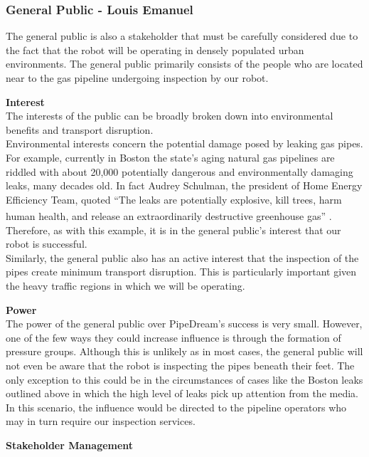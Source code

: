 \documentclass[11pt]{article}		%
\newcommand{\supercite}[1]{\textsuperscript{\cite{#1}}}		%
\begin{document}
		\subsubsection[General Public]{General Public - Louis Emanuel}
			The general public is also a stakeholder that must be carefully considered due to the fact that the robot will be operating in densely populated urban environments. The general public primarily consists of the people who are located near to the gas pipeline undergoing inspection by our robot.
			
			\textbf{Interest}\\
	        The interests of the public can be broadly broken down into environmental benefits and transport disruption.\\
		    \hspace*{3ex}Environmental interests concern the potential damage posed by leaking gas pipes. For example, currently in Boston the state’s aging natural gas pipelines are riddled with about 20,000 potentially dangerous and environmentally damaging leaks, many decades old. In fact Audrey Schulman, the president of Home Energy Efficiency Team, quoted  “The leaks are potentially explosive, kill trees, harm human health, and release an extraordinarily destructive greenhouse gas” \supercite{leaks}. Therefore, as with this example, it is in the general public's interest that our robot is successful. \\
	        \hspace*{3ex}Similarly, the general public also has an active interest that the inspection of the pipes create minimum transport disruption. This is particularly important given the heavy traffic regions in which we will be operating. 
	        
	        \textbf{Power}\\
	        The power of the general public over PipeDream's success is very small. However, one of the few ways they could increase influence is through the formation of pressure groups. Although this is unlikely as in most cases, the general public will not even be aware that the robot is inspecting the pipes beneath their feet. The only exception to this could be in the circumstances of cases like the Boston leaks outlined above in which the high level of leaks pick up attention from the media. In this scenario, the influence would be directed to the pipeline operators who may in turn require our inspection services.
	        
	        \textbf{Stakeholder Management}
	        
\end{document}
